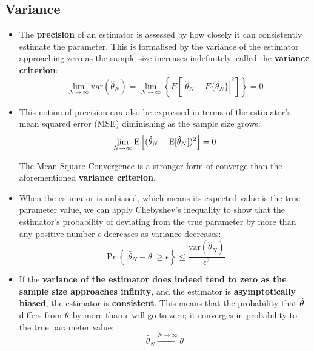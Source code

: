 \subsection{Variance}

\begin{itemize}
    \item The \textbf{precision} of an estimator is assessed by how closely it can consistently estimate the parameter. This is formalised by the variance of the estimator approaching zero as the sample size increases indefinitely, called the \textbf{variance criterion}:
    \begin{equation}
    \lim_{N \to \infty} \mathrm{var}(\hat{\theta}_N) = \lim_{N\to\infty}\left\{E\left[\left|\hat{\theta}_N-E\{\hat{\theta}_N\}\right|^2\right]\right\}=0
    \end{equation}
    
    \item This notion of precision can also be expressed in terms of the estimator's mean squared error (MSE) diminishing as the sample size grows:
    \begin{equation}
    \lim_{N \to \infty} \text{E}\left[ (\hat{\theta}_N - \text{E}[\hat{\theta}_N])^2 \right] = 0
    \end{equation}

    The Mean Square Convergence is a stronger form of converge than the aforementioned \textbf{variance criterion}.
    
    \item When the estimator is unbiased, which means its expected value is the true parameter value, we can apply Chebyshev's inequality to show that the estimator's probability of deviating from the true parameter by more than any positive number \(\epsilon\) decreases as variance decreases:
    \begin{equation}
    \Pr\left\{|\hat{\theta}_N - \theta| \geq \epsilon\right\} \leq \frac{\mathrm{var}(\hat{\theta}_N)}{\epsilon^2}
    \end{equation}
    
    \item If the \textbf{variance of the estimator does indeed tend to zero as the sample size approaches infinity}, and the estimator is \textbf{asymptotically biased}, the estimator is \textbf{consistent}. This means that the probability that $\hat{\theta}$ differs from $\theta$ by more than $\epsilon$ will go to zero; it converges in probability to the true parameter value:
    \begin{equation}
    \hat{\theta}_N \xrightarrow{N \to \infty} \theta
    \end{equation}
\end{itemize}

